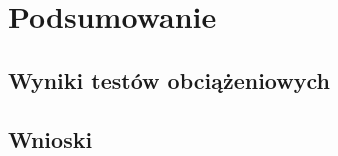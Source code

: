 \documentclass[../../thesis.tex]{subfiles}
\begin{document}
\chapter{Podsumowanie}

\section{Wyniki testów obciążeniowych}

\section{Wnioski}
\end{document}
